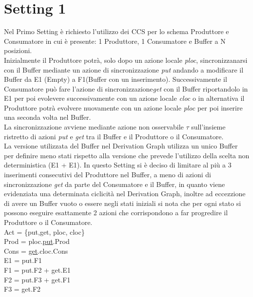 \documentclass{article}
\begin{document}
\section{Setting 1}
Nel Primo Setting è richiesto l'utilizzo dei CCS per lo schema Produttore e Consumatore in cui è presente: 1 Produttore, 1 Consumatore e Buffer a N posizioni.
\\Inizialmente il Produttore potrà, solo dopo un azione locale \textit{ploc}, sincronizzanarsi con il Buffer mediante un azione di sincronizzazione \textit{put} andando a modificare il Buffer da E1 (Empty) a F1(Buffer con un inserimento). Successivamente il Consumatore può fare l'azione di sincronizzazione\textit{get} con il Buffer riportandolo in E1 per poi evolevere successivamente con un azione locale \textit{cloc} o in alternativa il Produttore potrà evolvere nuovamente con un azione locale \textit{ploc} per poi inserire una seconda volta nel Buffer.
\\La sincronizzazione avviene mediante azione non osservabile $\tau$ sull'insieme ristretto di azioni \textit{put} e \textit{get} tra il Buffer e il Produttore o il Consumatore.
\\La versione utilizzata del Buffer nel Derivation Graph utilizza un unico Buffer per definire meno stati rispetto alla versione che prevede l'utilizzo della scelta non deterministica (E1 + E1).
In questo Setting si è deciso di limitare al più a 3 inserimenti consecutivi del Produttore nel Buffer, a meno di azioni di sincronizzazione \textit{get} da parte del Consumatore e il Buffer, in quanto viene evidenziata una determinata ciclicità nel Derivation Graph, inoltre ad eccezzione di avere un Buffer vuoto o essere negli stati iniziali si nota che per ogni stato si possono eseguire esattamente 2 azioni che corrispondono a far progredire il Produttore o il Consumatore.
\\Act = \{put,get, ploc, cloc\}
\\Prod = ploc.\underline{put}.Prod
\\Cons = \underline{get}.cloc.Cons
\\E1 = put.F1
\\F1 = put.F2 + get.E1
\\F2 = put.F3 + get.F1
\\F3 = get.F2
\end{document}
